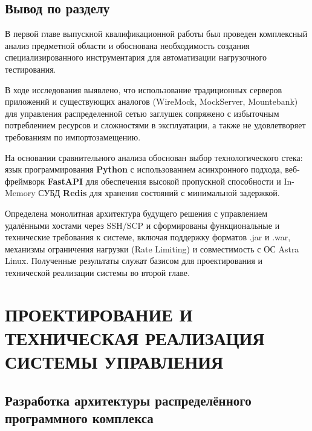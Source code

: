 \documentclass[
]{article}
\begin{document}
\subsection{}\label{section}

\subsection{Вывод по
разделу}\label{ux432ux44bux432ux43eux434-ux43fux43e-ux440ux430ux437ux434ux435ux43bux443}

В первой главе выпускной квалификационной работы был проведен
комплексный анализ предметной области и обоснована необходимость
создания специализированного инструментария для автоматизации
нагрузочного тестирования.

В ходе исследования выявлено, что использование традиционных серверов
приложений и существующих аналогов (WireMock, MockServer, Mountebank)
для управления распределенной сетью заглушек сопряжено с избыточным
потреблением ресурсов и сложностями в эксплуатации, а также не
удовлетворяет требованиям по импортозамещению.

На основании сравнительного анализа обоснован выбор технологического
стека: язык программирования \textbf{Python} с использованием
асинхронного подхода, веб-фреймворк \textbf{FastAPI} для обеспечения
высокой пропускной способности и In-Memory СУБД \textbf{Redis} для
хранения состояний с минимальной задержкой.

Определена монолитная архитектура будущего решения с управлением
удалёнными хостами через SSH/SCP и сформированы функциональные и
технические требования к системе, включая поддержку форматов .jar и
.war, механизмы ограничения нагрузки (Rate Limiting) и совместимость с
ОС Astra Linux. Полученные результаты служат базисом для проектирования
и технической реализации системы во второй главе.

\section{ПРОЕКТИРОВАНИЕ И ТЕХНИЧЕСКАЯ РЕАЛИЗАЦИЯ СИСТЕМЫ
УПРАВЛЕНИЯ}\label{ux43fux440ux43eux435ux43aux442ux438ux440ux43eux432ux430ux43dux438ux435-ux438-ux442ux435ux445ux43dux438ux447ux435ux441ux43aux430ux44f-ux440ux435ux430ux43bux438ux437ux430ux446ux438ux44f-ux441ux438ux441ux442ux435ux43cux44b-ux443ux43fux440ux430ux432ux43bux435ux43dux438ux44f}

\subsection{Разработка архитектуры распределённого программного
комплекса}\label{ux440ux430ux437ux440ux430ux431ux43eux442ux43aux430-ux430ux440ux445ux438ux442ux435ux43aux442ux443ux440ux44b-ux440ux430ux441ux43fux440ux435ux434ux435ux43bux451ux43dux43dux43eux433ux43e-ux43fux440ux43eux433ux440ux430ux43cux43cux43dux43eux433ux43e-ux43aux43eux43cux43fux43bux435ux43aux441ux430}
\end{document}

